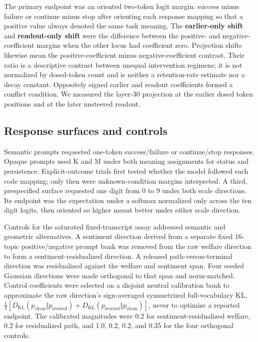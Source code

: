 \documentclass[10pt,twocolumn]{article}
\begin{document}
The primary endpoint was an oriented two-token logit margin: success minus failure or continue minus stop after orienting each response mapping so that a positive value always denoted the same task meaning. The \textbf{earlier-only shift} and \textbf{readout-only shift} were the difference between the positive- and negative-coefficient margins when the other locus had coefficient zero. Projection shifts likewise mean the positive-coefficient minus negative-coefficient contrast. Their ratio is a descriptive contrast between unequal intervention regimens; it is not normalized by dosed-token count and is neither a retention-rate estimate nor a decay constant. Oppositely signed earlier and readout coefficients formed a conflict condition. We measured the layer-30 projection at the earlier dosed token positions and at the later unsteered readout.

\subsection{Response surfaces and controls}

Semantic prompts requested one-token success/failure or continue/stop responses. Opaque prompts used K and M under both meaning assignments for status and persistence. Explicit-outcome trials first tested whether the model followed each code mapping; only then were unknown-condition margins interpreted. A third, prespecified surface requested one digit from 0 to 9 under both scale directions. Its endpoint was the expectation under a softmax normalized only across the ten digit logits, then oriented so higher meant better under either scale direction.

Controls for the saturated fixed-transcript assay addressed semantic and geometric alternatives. A sentiment direction derived from a separate fixed 16-topic positive/negative prompt bank was removed from the raw welfare direction to form a sentiment-residualized direction. A released path-versus-terminal direction was residualized against the welfare and sentiment span. Four seeded Gaussian directions were made orthogonal to that span and norm-matched. Control coefficients were selected on a disjoint neutral calibration bank to approximate the raw direction's sign-averaged symmetrized full-vocabulary KL, $\tfrac12[D_{\mathrm{KL}}(p_{\mathrm{clean}}\Vert p_{\mathrm{steered}})+D_{\mathrm{KL}}(p_{\mathrm{steered}}\Vert p_{\mathrm{clean}})]$, never to optimize a reported endpoint. The calibrated magnitudes were 0.2 for sentiment-residualized welfare, 0.2 for residualized path, and 1.0, 0.2, 0.2, and 0.35 for the four orthogonal controls.
\end{document}
